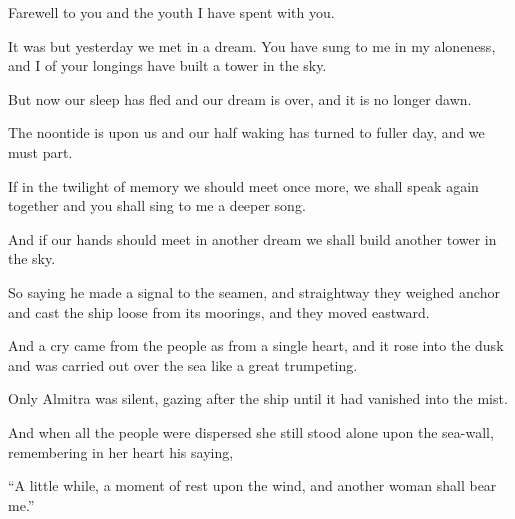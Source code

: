 Farewell to you and the youth I have
spent with you.

It was but yesterday we met in a
dream. You have sung to me in my
aloneness, and I of your longings have
built a tower in the sky.

But now our sleep has fled and our dream
is over, and it is no longer dawn.

The noontide is upon us and our half
waking has turned to fuller day, and we
must part.

If in the twilight of memory we should
meet once more, we shall speak again
together and you shall sing to me a
deeper song.

And if our hands should meet in another
dream we shall build another tower in
the sky.



So saying he made a signal to the
seamen, and straightway they weighed
anchor and cast the ship loose from its
moorings, and they moved eastward.

And a cry came from the people as from a
single heart, and it rose into the dusk
and was carried out over the sea like a
great trumpeting.

Only Almitra was silent, gazing after
the ship until it had vanished into
the mist.

And when all the people were dispersed
she still stood alone upon the sea-wall,
remembering in her heart his saying,

\enquote{A little while, a moment of rest upon
the wind, and another woman shall bear
me.}
